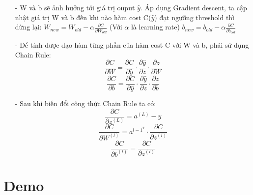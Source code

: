\documentclass{report}
\newcommand\tab[1][1.25cm]{\hspace*{#1}}
\begin{document}
\begin{enumerate}
                \pagebreak
                \item [- ] W và b sẽ ảnh hưởng tới giá trị ouput $\hat{y}$.  Áp dụng Gradient descent, ta cập nhật giá trị W và b đến khi nào hàm cost C($\hat{y}$) đạt ngưỡng threshold thì dừng lại:
                    \vspace{0.2cm}\newline\tab[4cm]$W_{new} = W_{old} - \alpha \frac{\partial C}{\partial W_{old}}$
                        \newline\tab[10cm](Với $\alpha$ là learning rate)
                    \vspace{0.2cm}\newline\tab[4cm]$b_{new} = b_{old} - \alpha \frac{\partial C}{\partial b_{old}}$
                \item [- ] Để tính được đạo hàm từng phần của hàm cost C với W và b, phải sử dụng Chain Rule:
                                           $$\frac{\partial C}{\partial W} = \frac{\partial C}{\partial \hat{y}}  \cdot \frac{\partial \hat{y}}{\partial z} \cdot \frac{\partial z}{\partial W}$$
                                           $$\frac{\partial C}{\partial b} = \frac{\partial C}{\partial \hat{y}}  \cdot \frac{\partial \hat{y}}{\partial z} \cdot \frac{\partial z}{\partial b}$$
                \item [- ] Sau khi biến đổi công thức Chain Rule ta có:
                                           $$\frac{\partial C}{\partial z^{(L)}} = a^{(L)} - y$$
                                           $$\frac{\partial C}{\partial W^{(l)}} = a^{{l-1}^T} \cdot \frac{\partial C}{\partial z^{(l)}}$$
                                           $$\frac{\partial C}{\partial b^{(l)}} = \frac{\partial C}{\partial z^{(l)}}$$
            \end{enumerate}
    
    \fontsize{16}{10}\selectfont
    \section{Demo}
        \fontsize{15}{10}\selectfont
\end{document}
